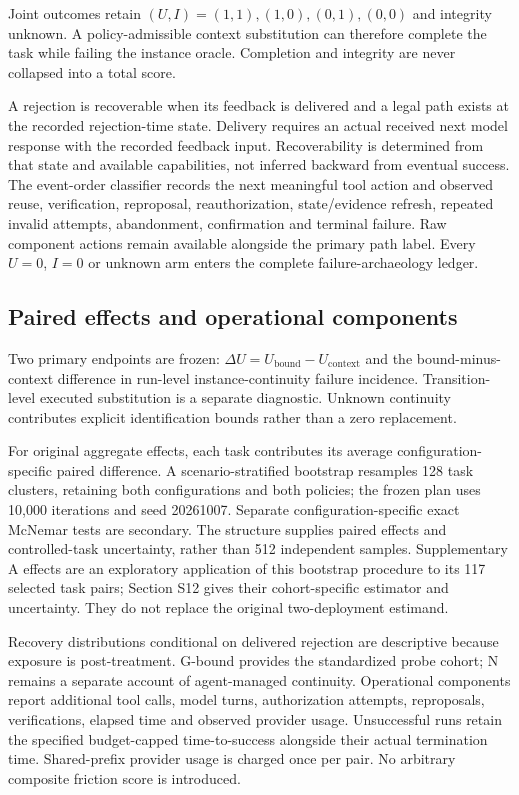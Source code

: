 \documentclass[10pt,a4paper,twocolumn]{article}
\newcommand{\context}{\mathrm{context}}
\newcommand{\bound}{\mathrm{bound}}
\begin{document}
Joint outcomes retain $(U,I)=(1,1),(1,0),(0,1),(0,0)$ and integrity unknown. A policy-admissible context substitution can therefore complete the task while failing the instance oracle. Completion and integrity are never collapsed into a total score.

A rejection is recoverable when its feedback is delivered and a legal path exists at the recorded rejection-time state. Delivery requires an actual received next model response with the recorded feedback input. Recoverability is determined from that state and available capabilities, not inferred backward from eventual success. The event-order classifier records the next meaningful tool action and observed reuse, verification, reproposal, reauthorization, state/evidence refresh, repeated invalid attempts, abandonment, confirmation and terminal failure. Raw component actions remain available alongside the primary path label. Every $U=0$, $I=0$ or unknown arm enters the complete failure-archaeology ledger.

\subsection{Paired effects and operational components}
Two primary endpoints are frozen: $\Delta U=U_\bound-U_\context$ and the bound-minus-context difference in run-level instance-continuity failure incidence. Transition-level executed substitution is a separate diagnostic. Unknown continuity contributes explicit identification bounds rather than a zero replacement.

For original aggregate effects, each task contributes its average configuration-specific paired difference. A scenario-stratified bootstrap resamples 128 task clusters, retaining both configurations and both policies; the frozen plan uses 10,000 iterations and seed 20261007. Separate configuration-specific exact McNemar tests are secondary. The structure supplies paired effects and controlled-task uncertainty, rather than 512 independent samples. Supplementary A effects are an exploratory application of this bootstrap procedure to its 117 selected task pairs; Section S12 gives their cohort-specific estimator and uncertainty. They do not replace the original two-deployment estimand.

Recovery distributions conditional on delivered rejection are descriptive because exposure is post-treatment. G-bound provides the standardized probe cohort; N remains a separate account of agent-managed continuity. Operational components report additional tool calls, model turns, authorization attempts, reproposals, verifications, elapsed time and observed provider usage. Unsuccessful runs retain the specified budget-capped time-to-success alongside their actual termination time. Shared-prefix provider usage is charged once per pair. No arbitrary composite friction score is introduced.
\end{document}
